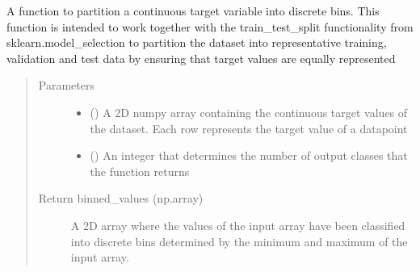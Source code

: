 \documentclass[letterpaper,10pt,english]{sphinxmanual}
\begin{document}
\begin{fulllineitems}
\label{\detokenize{modules/gqcml.datasets:gqcml.datasets.Datasets.bin_values}}
A function to partition a continuous target variable into discrete bins. This function is intended
to work together with the train\_test\_split functionality from sklearn.model\_selection to partition the
dataset into representative training, validation and test data by ensuring that target values are equally
represented
\begin{quote}\begin{description}
\item[{Parameters}] \leavevmode\begin{itemize}
\item {} 
\sphinxstyleliteralstrong{\sphinxupquote{(}}\sphinxstyleliteralstrong{\sphinxupquote{)}} () \textendash{} A 2D numpy array containing the continuous target values of the dataset.
Each row represents the target value of a datapoint

\item {} 
\sphinxstyleliteralstrong{\sphinxupquote{(}}\sphinxstyleliteralstrong{\sphinxupquote{)}} () \textendash{} An integer that determines the number of output classes that the function returns

\end{itemize}

\item[{Return binned\_values (np.array)}] \leavevmode
A 2D array where the values of the input array have been classified into
discrete bins determined by the minimum and maximum of the input array.

\end{description}\end{quote}

\end{fulllineitems}

\end{document}
